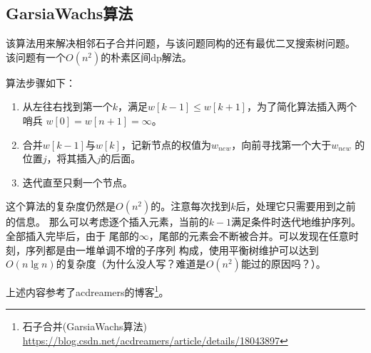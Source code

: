 \subsection{GarsiaWachs算法}
该算法用来解决相邻石子合并问题，与该问题同构的还有最优二叉搜索树问题。
该问题有一个$O(n^2)$的朴素区间dp解法。

算法步骤如下：
\begin{enumerate}
    \item 从左往右找到第一个$k$，满足$w[k-1] \leq w[k+1]$，为了简化算法插入两个哨兵
    $w[0]=w[n+1]=\infty$。
    \item 合并$w[k-1]$与$w[k]$，记新节点的权值为$w_{new}$，向前寻找第一个大于$w_{new}$
    的位置$j$，将其插入$j$的后面。
    \item 迭代直至只剩一个节点。
\end{enumerate}

这个算法的复杂度仍然是$O(n^2)$的。注意每次找到$k$后，处理它只需要用到之前的信息。
那么可以考虑逐个插入元素，当前的$k-1$满足条件时迭代地维护序列。全部插入完毕后，由于
尾部的$\infty$，尾部的元素会不断被合并。可以发现在任意时刻，序列都是由一堆单调不增的子序列
构成，使用平衡树维护可以达到$O(n\lg n)$的复杂度（为什么没人写？难道是$O(n^2)$能过的原因吗？）。


上述内容参考了acdreamers的博客\footnote{
    石子合并(GarsiaWachs算法)\\
    \url{https://blog.csdn.net/acdreamers/article/details/18043897}
}。
